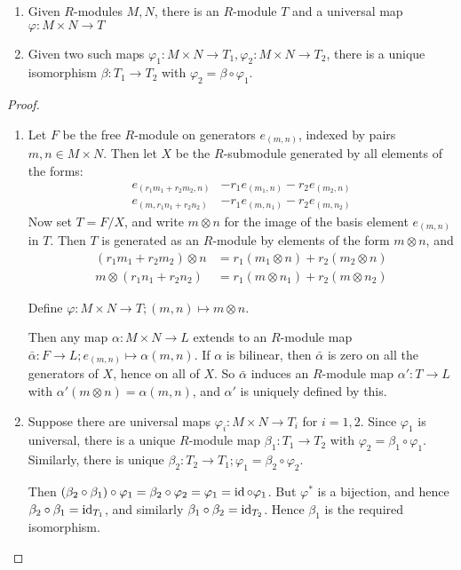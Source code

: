 \documentclass[10pt,a4paper]{article}
\begin{document}
\begin{lemma}\hspace*{0cm}
  \begin{enumerate}
    \item Given $R$-modules $M, N$, there is an $R$-module $T$ and a universal map $\varphi:M\times N \to T$
    \item Given two such maps $\varphi_1:M\times N \to T_1, \varphi_2:M \times N \to T_2$, there is a unique isomorphism $\beta:T_1 \to T_2$ with $\varphi_2 = \beta \circ \varphi_1$.
  \end{enumerate}
\end{lemma}
\begin{proof}\hspace*{0cm}
  \begin{enumerate}[label=\textit{\arabic*.}]
    \item Let $F$ be the free $R$-module on generators $e_{(m,n)}$, indexed by pairs $m, n \in M\times N$. Then let $X$ be the $R$-submodule generated by all elements of the forms:
    \begin{align*}
      e_{(r_1m_1+r_2m_2, n)} &- r_1e_{(m_1,n)}-r_2e_{(m_2, n)}\\
      e_{(m, r_1n_1+r_2n_2)} &- r_1e_{(m,n_1)}-r_2e_{(m, n_2)}
    \end{align*}
    Now set $T = F/X$, and write $m\otimes n$ for the image of the basis element $e_{(m,n)}$ in $T$. Then $T$ is generated as an $R$-module by elements of the form $m \otimes n$, and
    \begin{align*}
      (r_1m_1 + r_2m_2)\otimes n &= r_1(m_1\otimes n) + r_2(m_2\otimes n)\\
      m \otimes (r_1n_1+r_2n_2) &= r_1(m\otimes n_1) + r_2(m \otimes n_2)
    \end{align*}

    Define $\varphi:M\times N \to T; (m, n) \mapsto m\otimes n$.

    Then any map $\alpha:M \times N \to L$ extends to an $R$-module map $\bar{\alpha}:F \to L; e_{(m,n)}\mapsto \alpha(m, n)$. If $\alpha$ is bilinear, then $\bar{\alpha}$ is zero on all the generators of $X$, hence on all of $X$. So $\bar{\alpha}$ induces an $R$-module map $\alpha':T \to L$ with $\alpha'(m\otimes n) = \alpha(m,n)$, and $\alpha'$ is uniquely defined by this.

    \item Suppose there are universal maps $\varphi_i : M \times N \to T_i$ for $i =1, 2$. Since $\varphi_1$ is universal, there is a unique $R$-module map $\beta_1:T_1 \to T_2$ with $\varphi_2=\beta_1\circ \varphi_1$. Similarly, there is unique $\beta_2:T_2\to T_1; \varphi_1 = \beta_2\circ \varphi_2$.

    Then $(\beta_2 \circ \beta_1) \circ \varphi_1 = \beta_2\circ \varphi_2= \varphi_1 = \operatorname{id} \circ \varphi_1$. But $\varphi^\ast$ is a bijection, and hence $\beta_2 \circ \beta_1 = \operatorname{id}_{T_1}$, and similarly $\beta_1\circ \beta_2 = \operatorname{id}_{T_2}$. Hence $\beta_1$ is the required isomorphism.
  \end{enumerate}
\end{proof}
\end{document}
